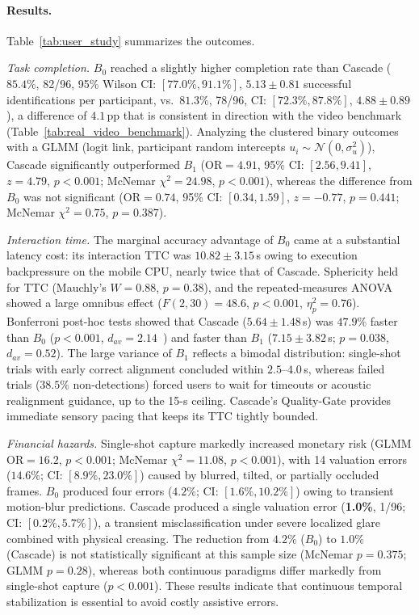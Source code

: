 \documentclass[final,5p,times,twocolumn,authoryear]{elsarticle}
\begin{document}
\paragraph{Results.}
Table~\ref{tab:user_study} summarizes the outcomes.

\textit{Task completion.} $B_0$ reached a slightly higher completion rate than Cascade ($85.4\%$, 82/96, 95\% Wilson CI: $[77.0\%, 91.1\%]$, $5.13 \pm 0.81$ successful identifications per participant, vs.\ $81.3\%$, 78/96, CI: $[72.3\%, 87.8\%]$, $4.88 \pm 0.89$), a difference of $4.1$\,pp that is consistent in direction with the video benchmark (Table~\ref{tab:real_video_benchmark}). Analyzing the clustered binary outcomes with a GLMM (logit link, participant random intercepts $u_i \sim \mathcal{N}(0, \sigma_u^2)$), Cascade significantly outperformed $B_1$ ($\text{OR} = 4.91$, 95\% CI: $[2.56, 9.41]$, $z = 4.79$, $p < 0.001$; McNemar $\chi^2 = 24.98$, $p < 0.001$), whereas the difference from $B_0$ was not significant ($\text{OR} = 0.74$, 95\% CI: $[0.34, 1.59]$, $z = -0.77$, $p = 0.441$; McNemar $\chi^2 = 0.75$, $p = 0.387$).

\textit{Interaction time.} The marginal accuracy advantage of $B_0$ came at a substantial latency cost: its interaction TTC was $10.82 \pm 3.15$\,s owing to execution backpressure on the mobile CPU, nearly twice that of Cascade. Sphericity held for TTC (Mauchly's $W = 0.88$, $p = 0.38$), and the repeated-measures ANOVA showed a large omnibus effect ($F(2,30) = 48.6$, $p < 0.001$, $\eta_p^2 = 0.76$). Bonferroni post-hoc tests showed that Cascade ($5.64 \pm 1.48$\,s) was $47.9\%$ faster than $B_0$ ($p < 0.001$, $d_{av} = 2.14$~\cite{Lakens2013}) and faster than $B_1$ ($7.15 \pm 3.82$\,s; $p = 0.038$, $d_{av} = 0.52$). The large variance of $B_1$ reflects a bimodal distribution: single-shot trials with early correct alignment concluded within $2.5$--$4.0$\,s, whereas failed trials ($38.5\%$ non-detections) forced users to wait for timeouts or acoustic realignment guidance, up to the 15-s ceiling. Cascade's Quality-Gate provides immediate sensory pacing that keeps its TTC tightly bounded.

\textit{Financial hazards.} Single-shot capture markedly increased monetary risk (GLMM $\text{OR} = 16.2$, $p < 0.001$; McNemar $\chi^2 = 11.08$, $p < 0.001$), with 14 valuation errors ($14.6\%$; CI: $[8.9\%, 23.0\%]$) caused by blurred, tilted, or partially occluded frames. $B_0$ produced four errors ($4.2\%$; CI: $[1.6\%, 10.2\%]$) owing to transient motion-blur predictions. Cascade produced a single valuation error (\textbf{1.0\%}, 1/96; CI: $[0.2\%, 5.7\%]$), a transient misclassification under severe localized glare combined with physical creasing. The reduction from $4.2\%$ ($B_0$) to $1.0\%$ (Cascade) is not statistically significant at this sample size (McNemar $p = 0.375$; GLMM $p = 0.28$), whereas both continuous paradigms differ markedly from single-shot capture ($p < 0.001$). These results indicate that continuous temporal stabilization is essential to avoid costly assistive errors.
\end{document}
